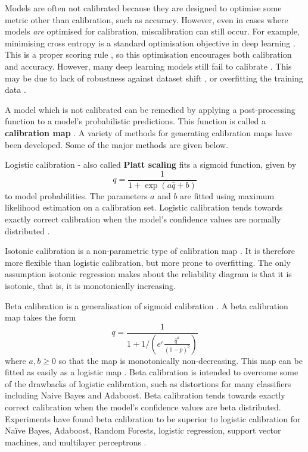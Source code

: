 Models are often not calibrated because they are designed to optimise some metric other than calibration, such as accuracy. However, even in cases where models {\it are} optimised for calibration, miscalibration can still occur. For example, minimising cross entropy is a standard optimisation objective in deep learning \cite{deep_learning}. This is a proper scoring rule \cite{scoring_rules}, so this optimisation encourages both calibration and accuracy. However, many deep learning models still fail to calibrate \cite{nn_calibration}. This may be due to lack of robustness against dataset shift \cite{dataset_drift}, or overfitting the training data \cite{nn_calibration}.

A model which is not calibrated can be remedied by applying a post-processing function to a model's probabilistic predictions. This function is called a {\bf calibration map} \cite{calibrating}. A variety of methods for generating calibration maps have been developed. Some of the major methods are given below.

Logistic calibration - also called {\bf Platt scaling} \cite{platt} fits a sigmoid function, given by
\begin{equation}
	q = \frac{1}{1 + \exp(a\hat{q} + b)}
\end{equation}
to model probabilities. The parameters $a$ and $b$ are fitted using maximum likelihood estimation on a calibration set. Logistic calibration tends towards exactly correct calibration when the model's confidence values are normally distributed \cite{beyond_sigmoids}. 

Isotonic calibration is a non-parametric type of calibration map \cite{isotonic_calibration}. It is therefore more flexible than logistic calibration, but more prone to overfitting. The only assumption isotonic regression makes about the reliability diagram is that it is isotonic, that is, it is monotonically increasing. 

Beta calibration is a generalisation of sigmoid calibration \cite{beyond_sigmoids}. A beta calibration map takes the form
\begin{equation}
	q = \frac{1}{1 + 1/\left(e^c\frac{\hat{q}^a}{(1-\hat{p})^b}\right) }
\end{equation}
where $a,b\ge 0$ so that the map is monotonically non-decreasing. This map can be fitted as easily as a logistic map \cite{beyond_sigmoids}. Beta calibration is intended to overcome some of the drawbacks of logistic calibration, such as distortions for many classifiers including Naive Bayes and Adaboost. Beta calibration tends towards exactly correct calibration when the model's confidence values are beta distributed. Experiments have found beta calibration to be superior to logistic calibration for Na\"{i}ve Bayes, Adaboost, Random Forests, logistic regression, support vector machines, and multilayer perceptrons \cite{beyond_sigmoids}. 

